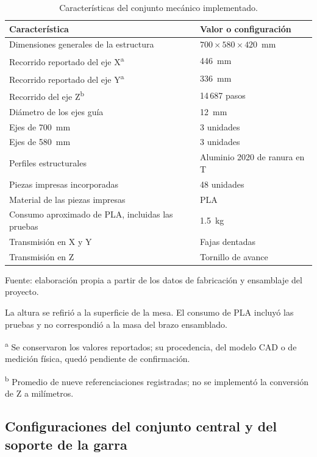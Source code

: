 \begin{table}[H]
    \centering
    \caption{Características del conjunto mecánico implementado.}
    \label{tab:fase3_caracteristicas}
    \begin{tabular}{p{}p{}}
        \hline
        Característica & Valor o configuración \\
        \hline
        Dimensiones generales de la estructura & $700 \times 580 \times 420$~mm \\
        Recorrido reportado del eje X\textsuperscript{a} & 446~mm \\
        Recorrido reportado del eje Y\textsuperscript{a} & 336~mm \\
        Recorrido del eje Z\textsuperscript{b} & 14\,687 pasos \\
        Diámetro de los ejes guía & 12~mm \\
        Ejes de 700~mm & 3 unidades \\
        Ejes de 580~mm & 3 unidades \\
        Perfiles estructurales & Aluminio 2020 de ranura en T \\
        Piezas impresas incorporadas & 48 unidades \\
        Material de las piezas impresas & PLA \\
        Consumo aproximado de PLA, incluidas las pruebas & 1.5~kg \\
        Transmisión en X y Y & Fajas dentadas \\
        Transmisión en Z & Tornillo de avance \\
        \hline
    \end{tabular}

    \par\small\raggedright Fuente: elaboración propia a partir de los datos de fabricación y ensamblaje del proyecto.
    \par\small La altura se refirió a la superficie de la mesa. El consumo de PLA incluyó las pruebas y no correspondió a la masa del brazo ensamblado.
    \par\small\textsuperscript{a} Se conservaron los valores reportados; su procedencia, del modelo CAD o de medición física, quedó pendiente de confirmación.
    \par\small\textsuperscript{b} Promedio de nueve referenciaciones registradas; no se implementó la conversión de Z a milímetros.
\end{table}


\subsection{Configuraciones del conjunto central y del soporte de la garra}

